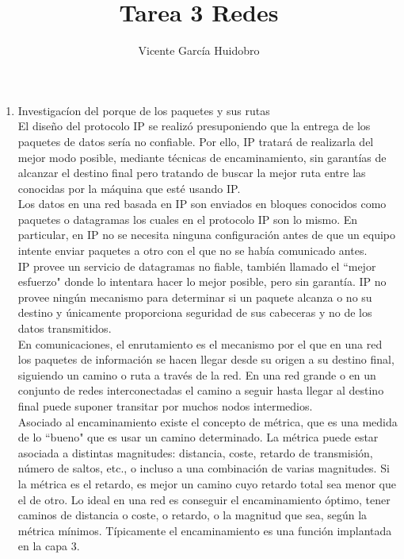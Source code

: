 \documentclass{article}
\title{Tarea 3 Redes}
\author{Vicente Garc\'ia Huidobro}
\date{}
\begin{document}
\maketitle

 \begin{enumerate}
\item Investigac\'ion del porque de los paquetes y sus rutas \\
El dise\~no del protocolo IP se realiz\'o presuponiendo que la entrega de los paquetes de datos ser\'ia no confiable. Por ello, IP tratar\'a de realizarla del mejor modo posible, mediante t\'ecnicas de encaminamiento, sin garant\'ias de alcanzar el destino final pero tratando de buscar la mejor ruta entre las conocidas por la m\'aquina que est\'e usando IP.\\
Los datos en una red basada en IP son enviados en bloques conocidos como paquetes o datagramas los cuales en el protocolo IP son lo mismo. En particular, en IP no se necesita ninguna configuraci\'on antes de que un equipo intente enviar paquetes a otro con el que no se hab\'ia comunicado antes.\\
IP provee un servicio de datagramas no fiable, tambi\'en llamado el ``mejor esfuerzo" donde lo intentara hacer lo mejor posible, pero sin garant\'ia. IP no provee ningún mecanismo para determinar si un paquete alcanza o no su destino y únicamente proporciona seguridad de sus cabeceras y no de los datos transmitidos.\\
En comunicaciones, el enrutamiento es el mecanismo por el que en una red los paquetes de informaci\'on se hacen llegar desde su origen a su destino final, siguiendo un camino o ruta a trav\'es de la red. En una red grande o en un conjunto de redes interconectadas el camino a seguir hasta llegar al destino final puede suponer transitar por muchos nodos intermedios.\\
Asociado al encaminamiento existe el concepto de m\'etrica, que es una medida de lo ``bueno" que es usar un camino determinado. La m\'etrica puede estar asociada a distintas magnitudes: distancia, coste, retardo de transmisi\'on, n\'umero de saltos, etc., o incluso a una combinaci\'on de varias magnitudes. Si la m\'etrica es el retardo, es mejor un camino cuyo retardo total sea menor que el de otro. Lo ideal en una red es conseguir el encaminamiento \'optimo, tener caminos de distancia o coste, o retardo, o la magnitud que sea, seg\'un la m\'etrica m\'inimos. T\'ipicamente el encaminamiento es una funci\'on implantada en la capa 3.


\end{enumerate}
\end{document}
